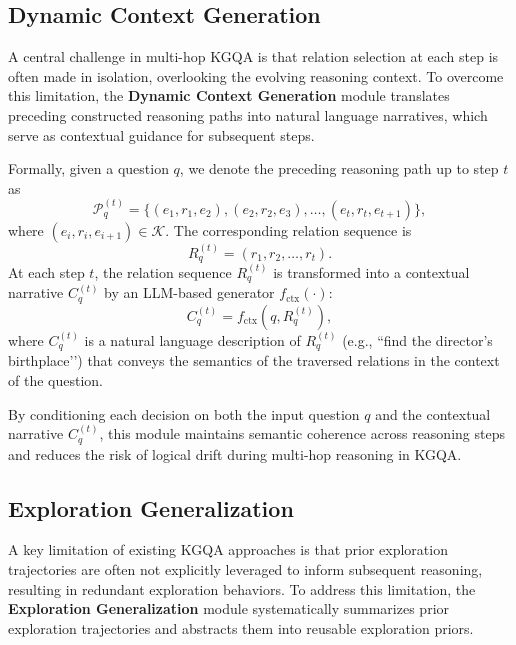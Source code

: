 \subsection{Dynamic Context Generation}

A central challenge in multi-hop KGQA is that relation selection at each step is often made in isolation, overlooking the evolving reasoning context. To overcome this limitation, the \textbf{Dynamic Context Generation} module translates preceding constructed reasoning paths into natural language narratives, which serve as contextual guidance for subsequent steps.

Formally, given a question $q$, we denote the preceding reasoning path up to step $t$ as
\begin{equation}
\mathcal{P}_q^{(t)} = \{(e_1, r_1, e_2), (e_2, r_2, e_3), \ldots, (e_t, r_t, e_{t+1})\},
\end{equation}
where $(e_i, r_i, e_{i+1}) \in \mathcal{K}$.  
The corresponding relation sequence is
\begin{equation}
R_q^{(t)} = (r_1, r_2, \ldots, r_t).
\end{equation}
At each step $t$, the relation sequence $R_q^{(t)}$ is transformed into a contextual narrative $C_q^{(t)}$ by an LLM-based generator $f_{\text{ctx}}(\cdot)$:
\begin{equation}
C_q^{(t)} = f_{\text{ctx}}(q, R_q^{(t)}),
\end{equation}
where $C_q^{(t)}$ is a natural language description of $R_q^{(t)}$ (e.g., ``find the director’s birthplace’’) that conveys the semantics of the traversed relations in the context of the question. 

By conditioning each decision on both the input question $q$ and the contextual narrative $C_q^{(t)}$, this module maintains semantic coherence across reasoning steps and reduces the risk of logical drift during multi-hop reasoning in KGQA.


\subsection{Exploration Generalization}\label{sec:eg}

A key limitation of existing KGQA approaches is that prior exploration trajectories are often not explicitly leveraged to inform subsequent reasoning, resulting in redundant exploration behaviors. To address this limitation, the \textbf{Exploration Generalization} module systematically summarizes prior exploration trajectories and abstracts them into reusable exploration priors. 

